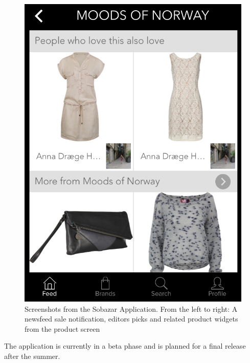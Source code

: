 \begin{figure}[H]
\begin{minipage}{.3\linewidth}
			  \includegraphics[height=1.5\linewidth]{image/sobazarrelated.png}
		\end{minipage}
		\caption[Sobazar screenshots - version 0.5.1]{Screenshots from the Sobazar Application. From the left to right: A newsfeed sale notification, editors picks and related product widgets from the product screen}
		\label{figure:sobazarfeed}
	\end{figure}

	The application is currently in a beta phase and is planned for a final release after the summer. 
	


